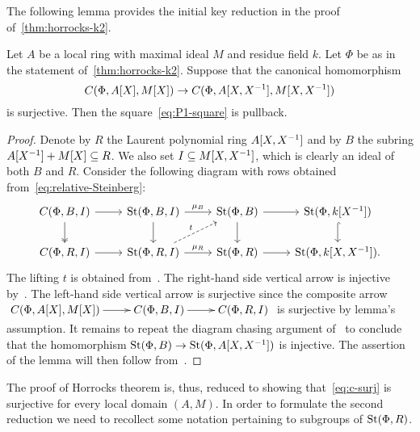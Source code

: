 The following lemma provides the initial key reduction in the proof of~\cref{thm:horrocks-k2}.
\begin{lemma} \label{lem:first-reduction}
Let $A$ be a local ring with maximal ideal $M$ and residue field $k$.
Let $\Phi$ be as in the statement of~\cref{thm:horrocks-k2}.
Suppose that the canonical homomorphism
\begin{equation} \label{eq:c-surj} C(\Phi, A[X], M[X]) \to C(\Phi, A[X, X^{-1}], M[X, X^{-1}]) \end{equation}
is surjective.
Then the square~\eqref{eq:P1-square} is pullback.
\end{lemma}
\begin{proof}
    Denote by $R$ the Laurent polynomial ring $A[X, X^{-1}]$ and by $B$ the subring $A[X^{-1}] + M[X] \subseteq R$.
    We also set $I \subseteq M[X, X^{-1}]$, which is clearly an ideal of both $B$ and $R$.
    Consider the following diagram with rows obtained from~\eqref{eq:relative-Steinberg}:
    \[\begin{tikzcd}
          C(\Phi, B, I) \arrow{r} \arrow[d, swap, twoheadrightarrow] & \St(\Phi, B, I) \arrow{r}{\mu_B} \arrow{d} & \St(\Phi, B) \arrow{r} \arrow{d} & \St(\Phi, k[X^{-1}]) \arrow[hookrightarrow]{d} \\
          C(\Phi, R, I) \arrow{r} & \St(\Phi, R, I) \arrow{r}{\mu_R} \arrow[ur, "t", dashrightarrow] & \St(\Phi, R) \arrow{r} & \St(\Phi, k[X, X^{-1}]).
    \end{tikzcd}\]
    The lifting $t$ is obtained from~\cite[Lemma~3.3]{LS20}.
    The right-hand side vertical arrow is injective by~\cite[Lemma~2.2]{LS20}.
    The left-hand side vertical arrow is surjective since the composite arrow
    $\xymatrix{ C(\Phi, A[X], M[X]) \ar[r] & C(\Phi, B, I) \ar[r] & C(\Phi, R, I) }$
    is surjective by lemma's assumption.
    It remains to repeat the diagram chasing argument of~\cite[Theorem~1]{LS20} to conclude that the homomorphism $\operatorname{St}(\Phi, B) \to \operatorname{St}(\Phi, A[X, X^{-1}])$ is injective.
    The assertion of the lemma will then follow from~\cite[Theorem~3]{LS20}.
\end{proof}
The proof of Horrocks theorem is, thus, reduced to showing that~\eqref{eq:c-surj} is surjective for every local domain $(A, M)$.
In order to formulate the second reduction we need to recollect some notation pertaining to subgroups of $\operatorname{St}(\Phi, R)$.

